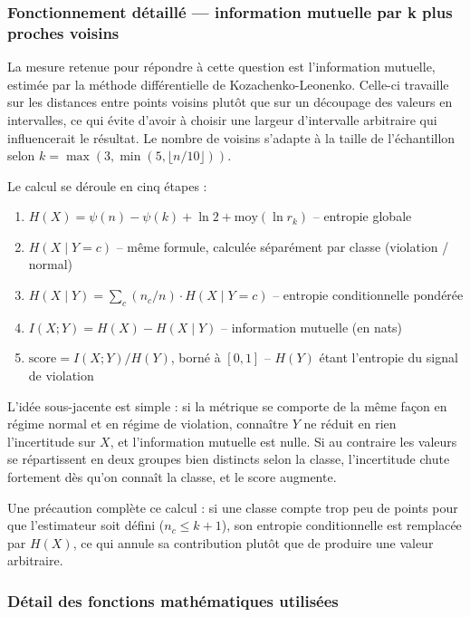 \subsubsection{Fonctionnement détaillé — information mutuelle par k plus proches voisins}

La mesure retenue pour répondre à cette question est l'information mutuelle, estimée par la méthode différentielle de Kozachenko-Leonenko. Celle-ci travaille sur les distances entre points voisins plutôt que sur un découpage des valeurs en intervalles, ce qui évite d'avoir à choisir une largeur d'intervalle arbitraire qui influencerait le résultat. Le nombre de voisins s'adapte à la taille de l'échantillon selon $k = \max(3, \min(5, \lfloor n/10 \rfloor))$.

Le calcul se déroule en cinq étapes :

\begin{enumerate}
    \item $H(X) = \psi(n) - \psi(k) + \ln 2 + \mathrm{moy}(\ln r_k)$ -- entropie globale
    \item $H(X \mid Y = c)$ -- même formule, calculée séparément par classe (violation / normal)
    \item $H(X \mid Y) = \sum_c (n_c/n) \cdot H(X \mid Y = c)$ -- entropie conditionnelle pondérée
    \item $I(X;Y) = H(X) - H(X \mid Y)$ -- information mutuelle (en nats)
    \item $\mathrm{score} = I(X;Y) / H(Y)$, borné à $[0,1]$ -- $H(Y)$ étant l'entropie du signal de violation
\end{enumerate}

L'idée sous-jacente est simple : si la métrique se comporte de la même façon en régime normal et en régime de violation, connaître $Y$ ne réduit en rien l'incertitude sur $X$, et l'information mutuelle est nulle. Si au contraire les valeurs se répartissent en deux groupes bien distincts selon la classe, l'incertitude chute fortement dès qu'on connaît la classe, et le score augmente.

Une précaution complète ce calcul : si une classe compte trop peu de points pour que l'estimateur soit défini ($n_c \leq k+1$), son entropie conditionnelle est remplacée par $H(X)$, ce qui annule sa contribution plutôt que de produire une valeur arbitraire.

\subsubsection{Détail des fonctions mathématiques utilisées}

